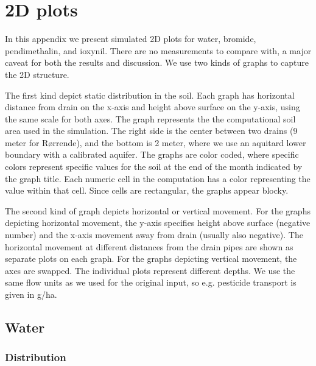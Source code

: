 \newcommand{\figrorrende}[1]{\texttt{[image: fig/\#1]}}
\newcommand{\figrorrendel}[1]{\hspace*{-2cm}\figrorrende{#1}}

\chapter{2D plots}
\label{app:plot-2d}

In this appendix we present simulated 2D plots for water, bromide,
pendimethalin, and ioxynil.  There are no measurements to compare
with, a major caveat for both the results and discussion.  We use two
kinds of graphs to capture the 2D structure.

The first kind depict static distribution in the soil.  Each graph has
horizontal distance from drain on the x-axis and height above surface
on the y-axis, using the same scale for both axes.  The graph
represents the the computational soil area used in the simulation.
The right side is the center between two drains (9 meter for
R{\o}rrende), and the bottom is 2 meter, where we use an aquitard
lower boundary with a calibrated aquifer.  The graphs are color coded,
where specific colors represent specific values for the soil at the
end of the month indicated by the graph title.  Each numeric cell in
the computation has a color representing the value within that cell.
Since cells are rectangular, the graphs appear blocky.

The second kind of graph depicts horizontal or vertical movement.  For
the graphs depicting horizontal movement, the y-axis specifies height
above surface (negative number) and the x-axis movement away from
drain (usually also negative).  The horizontal movement at different
distances from the drain pipes are shown as separate plots on each
graph.  For the graphs depicting vertical movement, the axes are
swapped.  The individual plots represent different depths.  We use the
same flow units as we used for the original input, so e.g. pesticide
transport is given in g/ha.

\FloatBarrier
\section{Water}

\subsection{Distribution}


